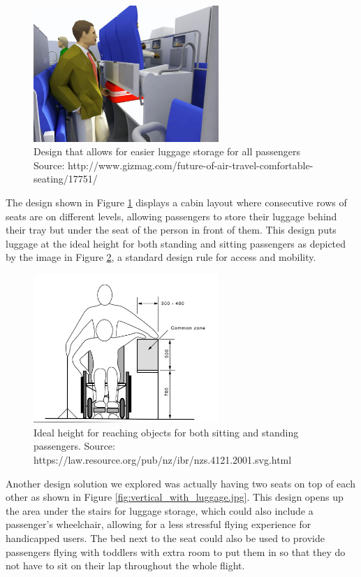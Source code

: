 \begin{figure}[h]
  \centering
     \includegraphics[width=7cm]{images/luggage_trays.png}
   \caption{Design that allows for easier luggage storage for all passengers Source: http://www.gizmag.com/future-of-air-travel-comfortable-seating/17751/}
  \label{fig:luggage_trays.png}
\end{figure}  

The design shown in Figure \ref{fig:luggage_trays.png} displays a cabin layout where consecutive rows of seats are on different levels, allowing passengers to store their luggage behind their tray but under the seat of the person in front of them. This design puts luggage at the ideal height for both standing and sitting passengers as depicted by the image in Figure \ref{fig:correct_height.png}, a standard design rule for access and mobility.  

\begin{figure}[h]
  \centering
     \includegraphics[width=7cm]{images/correct_height.png}
   \caption{Ideal height for reaching objects for both sitting and standing passengers. Source: https://law.resource.org/pub/nz/ibr/nzs.4121.2001.svg.html}
  \label{fig:correct_height.png}
\end{figure} 

Another design solution we explored was actually having two seats on top of each other as shown in Figure \ref{fig:vertical_with_luggage.jpg}. This design opens up the area under the stairs for luggage storage, which could also include a passenger’s wheelchair, allowing for a less stressful flying experience for handicapped users. The bed next to the seat could also be used to provide passengers flying with toddlers with extra room to put them in so that they do not have to sit on their lap throughout the whole flight. 

